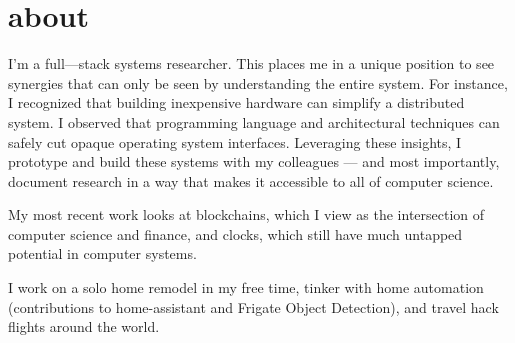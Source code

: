 \section{about}

I'm a full---stack systems researcher. This places me in a unique position to see synergies 
that can only be seen by understanding the entire system. For instance, I recognized that 
building inexpensive hardware 
can simplify a distributed system. I observed that programming language and architectural techniques 
can safely cut opaque operating system interfaces. Leveraging these insights, 
I prototype and build 
these systems with my colleagues --- and most importantly, document research in a way that makes it accessible to all of 
computer science.

My most recent work looks at blockchains, which I view as the intersection of computer science and finance, and clocks, which still have much untapped potential in computer systems.

I work on a solo home remodel in my free time, tinker with home automation (contributions to 
home-assistant and Frigate Object Detection), and travel hack flights around the world.


\clearpage



\clearpage













